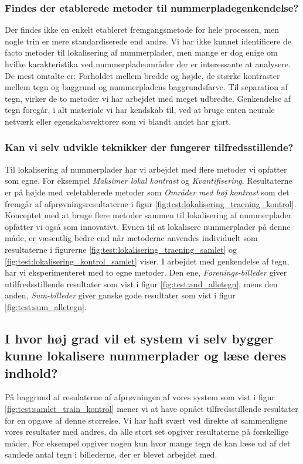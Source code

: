 \documentclass[11pt,a4paper,final]{article}
\begin{document}
\subsubsection*{Findes der etablerede metoder til nummerpladegenkendelse?}
Der findes ikke en enkelt etableret fremgangsmetode for hele processen, men nogle trin er mere standardiserede end andre. Vi har ikke kunnet identificere de facto metoder til lokalisering af nummerplader, men mange er dog enige om hvilke karakteristika ved nummerpladeområder der er interessante at analysere. De mest omtalte er: Forholdet mellem bredde og højde, de stærke kontraster mellem tegn og baggrund og nummerpladens baggrundsfarve. Til separation af tegn, virker de to metoder vi har arbejdet med meget udbredte. Genkendelse af tegn foregår, i alt materiale vi har kendskab til, ved at bruge enten neurale netværk eller egenskabsvektorer som vi blandt andet har gjort.    

\subsubsection*{Kan vi selv udvikle teknikker der fungerer tilfredsstillende?}
Til lokalisering af nummerplader har vi arbejdet med flere metoder vi opfatter som egne. For eksempel \textit{Maksimer lokal kontrast} og \textit{Kvantifisering}. Resultaterne er på højde med veletablerede metoder som \textit{Områder med høj kontrast} som det fremgår af afprøvningsresultaterne i figur \vref{fig:test:lokalisering_traening_kontrol}. Konceptet med at bruge flere metoder sammen til lokalisering af nummerplader opfatter vi også som innovativt. Evnen til at lokalisere nummerplader på denne måde, er væsentlig bedre end når metoderne anvendes individuelt som resultaterne i figurerne \ref{fig:test:lokalisering_traening_samlet} og \vref{fig:test:lokalisering_kontrol_samlet} viser. I arbejdet med genkendelse af tegn, har vi eksperimenteret med to egne metoder. Den ene, \textit{Forenings-billeder} giver utilfredsstillende resultater som vist i figur \vref{fig:test:and_alletegn}, mens den anden, \textit{Sum-billeder} giver ganske gode resultater som vist i figur \vref{fig:test:sum_alletegn}.

\subsection*{I hvor høj grad vil et system vi selv bygger kunne lokalisere nummerplader og læse deres indhold?}
På baggrund af resulaterne af afprøvningen af vores system som vist i figur \vref{fig:test:samlet_train_kontrol} mener vi at have opnået tilfredsstillende resultater for en opgave af denne størrelse. Vi har haft svært ved direkte at sammenligne vores resultater med andres, da alle stort set opgiver resultaterne på forskellige måder. For eksempel opgiver nogen kun hvor mange tegn de kan læse ud af det samlede antal tegn i billederne, der er blevet arbejdet med.  
\end{document}
